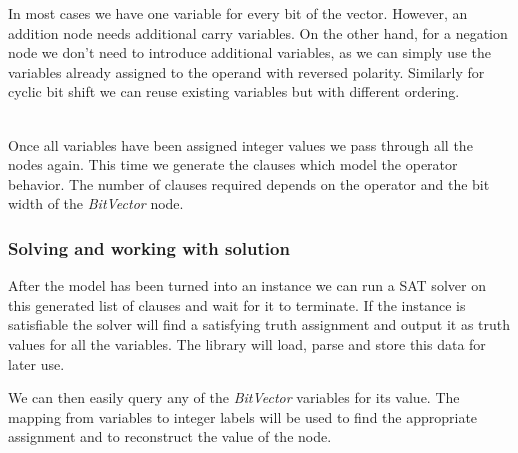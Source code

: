 In most cases we have one variable for every bit of the vector.
However, an addition node needs additional carry variables.
On the other hand, for a negation node we don't need to introduce additional variables, as we can simply use the variables already assigned to the operand with reversed polarity.
Similarly for cyclic bit shift we can reuse existing variables but with different ordering.

~\\

Once all variables have been assigned integer values we pass through all the nodes again.
This time we generate the clauses which model the operator behavior.
The number of clauses required depends on the operator and the bit width of the \emph{BitVector} node.

\subsubsection{Solving and working with solution}
After the model has been turned into an instance we can run a SAT solver on this generated list of clauses and wait for it to terminate.
If the instance is satisfiable the solver will find a satisfying truth assignment and output it as truth values for all the variables.
The library will load, parse and store this data for later use.

We can then easily query any of the \emph{BitVector} variables for its value.
The mapping from variables to integer labels will be used to find the appropriate assignment and to reconstruct the value of the node.




